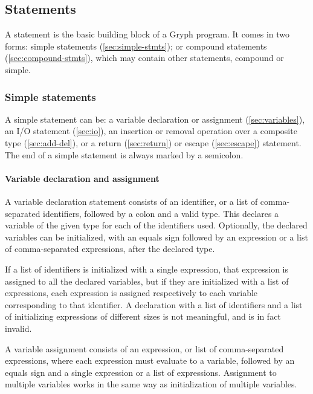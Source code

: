 \subsection{Statements}
\label{sec:statements}
A statement is the basic building block of a Gryph program. It comes in two forms: simple statements (\autoref{sec:simple-stmts}); or compound statements (\autoref{sec:compound-stmts}), which may contain other statements, compound or simple.

\subsubsection{Simple statements}
\label{sec:simple-stmts}
A simple statement can be: a variable declaration or assignment (\autoref{sec:variables}), an I/O statement (\autoref{sec:io}), an insertion or removal operation over a composite type (\autoref{sec:add-del}), or a return (\autoref{sec:return}) or escape (\autoref{sec:escape}) statement. The end of a simple statement is always marked by a semicolon.

\paragraph{Variable declaration and assignment}
\label{sec:variables}

A variable declaration statement consists of an identifier, or a list of comma-separated identifiers, followed by a colon and a valid type. This declares a variable of the given type for each of the identifiers used. Optionally, the declared variables can be initialized, with an equals sign followed by an expression or a list of comma-separated expressions, after the declared type. 

If a list of identifiers is initialized with a single expression, that expression is assigned to all the declared variables, but if they are initialized with a list of expressions, each expression is assigned respectively to each variable corresponding to that identifier. A declaration with a list of identifiers and a list of initializing expressions of different sizes is not meaningful, and is in fact invalid.

A variable assignment consists of an expression, or list of comma-separated expressions, where each expression must evaluate to a variable, followed by an equals sign and a single expression or a list of expressions. Assignment to multiple variables works in the same way as initialization of multiple variables.

